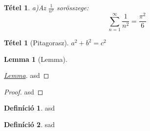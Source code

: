 \documentclass[]{article}
\begin{document}
\newtheorem{tet}{Tétel}
\newtheorem{tet2}{Tétel}
\newtheorem{lemma}{Lemma}
\theoremstyle{definition}
\newtheorem{defin}{Definíció}[section]
\begin{tet}
a)Az $\frac{1}{n^2}$ sorösszege: \\

\[ \sum_{n=1}^\infty \frac{1}{n^2}
= \frac{\pi^2}{6} \]
\end{tet}
\begin{tet2}[Pitagorasz]
$a^2+b^2=c^2$
\end{tet2}
\begin{lemma}[Lemma]

\end{lemma}
\begin{proof}[\hyperlink{tet}{Lemma}]
asd
\end{proof}
\begin{proof}
asd
\end{proof}
\begin{defin}
asd
\end{defin}
\begin{defin}
sad
\end{defin}
\end{document}
